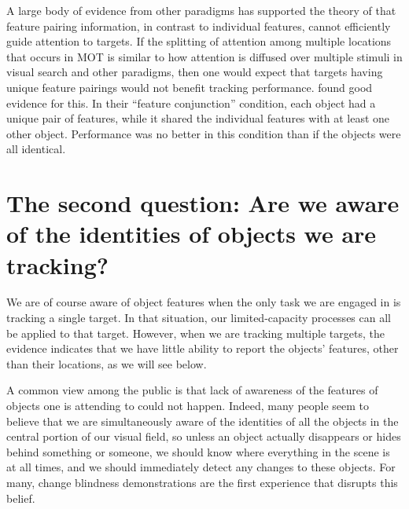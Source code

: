 \documentclass[
]{book}
\begin{document}
A large body of evidence from other paradigms has supported the theory of \citet{treismanFeatureIntegrationTheory1980} that feature pairing information, in contrast to individual features, cannot efficiently guide attention to targets. If the splitting of attention among multiple locations that occurs in MOT is similar to how attention is diffused over multiple stimuli in visual search and other paradigms, then one would expect that targets having unique feature pairings would not benefit tracking performance. \citet{makovskiFeatureBindingAttentive2009} found good evidence for this. In their ``feature conjunction'' condition, each object had a unique pair of features, while it shared the individual features with at least one other object. Performance was no better in this condition than if the objects were all identical.

\hypertarget{the-second-question-are-we-aware-of-the-identities-of-objects-we-are-tracking}{%
\section{The second question: Are we aware of the identities of objects we are tracking?}\label{the-second-question-are-we-aware-of-the-identities-of-objects-we-are-tracking}}

We are of course aware of object features when the only task we are engaged in is tracking a single target. In that situation, our limited-capacity processes can all be applied to that target. However, when we are tracking multiple targets, the evidence indicates that we have little ability to report the objects' features, other than their locations, as we will see below.

A common view among the public is that lack of awareness of the features of objects one is attending to could not happen. Indeed, many people seem to believe that we are simultaneously aware of the identities of all the objects in the central portion of our visual field, so unless an object actually disappears or hides behind something or someone, we should know where everything in the scene is at all times, and we should immediately detect any changes to these objects. For many, change blindness demonstrations are the first experience that disrupts this belief.
\end{document}
